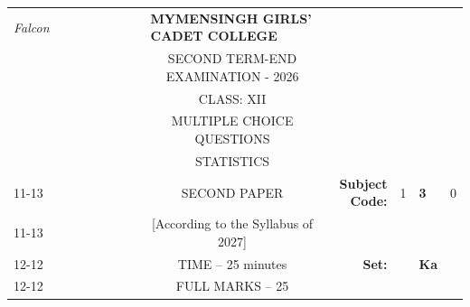 \documentclass[12pt]{exam}
\begin{document}

\begin{table}[]
\begin{tabular}{llllllllcllll}
\textit{Falcon} &  &  &  &  &  &  &  & \multicolumn{1}{l}{\textbf{MYMENSINGH GIRLS' CADET COLLEGE}} &                                             &                        &                                 &                        \\
                &  &  &  &  &  &  &  & \multicolumn{1}{c}{SECOND TERM-END EXAMINATION - 2026}       &                                             &                        & \multicolumn{1}{c}{}            &                        \\
                &  &  &  &  &  &  &  & CLASS: XII                                                   &                                             &                        & \multicolumn{1}{c}{}            &                        \\
                &  &  &  &  &  &  &  & MULTIPLE CHOICE QUESTIONS                                    &                                             &                        & \multicolumn{1}{c}{}            &                        \\
                &  &  &  &  &  &  &  & STATISTICS                                                   &                                             &                        & \multicolumn{1}{r}{}            &                        \\ \cline{11-13} 
                &  &  &  &  &  &  &  & SECOND PAPER                                                 & \multicolumn{1}{r|}{\textbf{Subject Code:}} & \multicolumn{1}{l|}{1} & \multicolumn{1}{l|}{\textbf{3}} & \multicolumn{1}{l|}{0} \\ \cline{11-13} 
                &  &  &  &  &  &  &  & [According to the Syllabus of 2027]                          & \multicolumn{1}{r}{}                        &                        &                                 &                        \\ \cline{12-12}
                &  &  &  &  &  &  &  & TIME – 25 minutes                                            & \multicolumn{1}{r}{\textbf{Set:}}           & \multicolumn{1}{l|}{}  & \multicolumn{1}{l|}{\textbf{Ka}} &                        \\ \cline{12-12}
                &  &  &  &  &  &  &  & FULL MARKS – 25                                              &                                             &                        &                                 &                       
\end{tabular}
\end{table}
\end{document}
